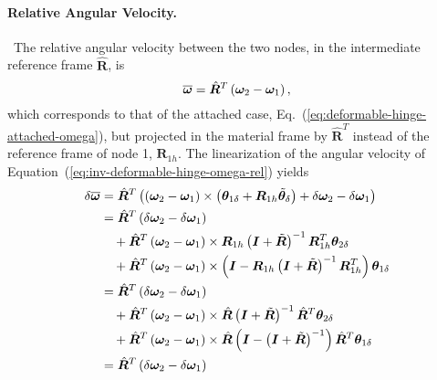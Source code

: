 \documentclass[10pt,fleqn,subeqn]{report}
\newcommand{\T}[1]{\bm{#1}}
\newcommand{\TT}[1]{\bm{#1}}
\begin{document}
\paragraph{Relative Angular Velocity.} \
The relative angular velocity between the two nodes,
in the intermediate reference frame $\hat{\T{R}}$, is
\begin{equation}
	\overline{\T{\omega}} = \hat{\T{R}}^T \plbr{\T{\omega}_2 - \T{\omega}_1}
	\label{eq:inv-deformable-hinge-omega-rel} ,
\end{equation}
which corresponds to that of the attached case,
Eq.~(\ref{eq:deformable-hinge-attached-omega}),
but projected in the material frame by $\hat{\TT{R}}^T$
instead of the reference frame of node 1, $\T{R}_{1h}$.
The linearization of the angular velocity 
of Equation~(\ref{eq:inv-deformable-hinge-omega-rel}) yields
\begin{align}
	\delta\overline{\T{\omega}}
	&= \hat{\T{R}}^T \plbr{
		\plbr{\T{\omega}_2 - \T{\omega}_1} \times \plbr{\T{\theta}_{1\delta} + \T{R}_{1h} \tilde{\T{\theta}}_{\delta}}
		+ \delta\T{\omega}_2 - \delta\T{\omega}_1
	} \nonumber \\
	&= \hat{\T{R}}^T \plbr{
		\delta\T{\omega}_2 - \delta\T{\omega}_1
	} \nonumber \\
	& \mbox{\hspace{10pt}} + \hat{\T{R}}^T \plbr{\T{\omega}_2 - \T{\omega}_1} \times 
			\T{R}_{1h}\plbr{\T{I} + \tilde{\T{R}}}^{-1} \T{R}_{1h}^T \T{\theta}_{2\delta} \nonumber \\
	& \mbox{\hspace{10pt}} + \hat{\T{R}}^T \plbr{\T{\omega}_2 - \T{\omega}_1} \times
			\plbr{\T{I} - \T{R}_{1h}\plbr{\T{I} + \tilde{\T{R}}}^{-1} \T{R}_{1h}^T} \T{\theta}_{1\delta} \nonumber \\
	&= \hat{\T{R}}^T \plbr{
		\delta\T{\omega}_2 - \delta\T{\omega}_1
	} \nonumber \\
	& \mbox{\hspace{10pt}} + \hat{\T{R}}^T \plbr{\T{\omega}_2 - \T{\omega}_1} \times 
			\hat{\T{R}}\plbr{\T{I} + \tilde{\T{R}}}^{-1} \hat{\T{R}}^T \T{\theta}_{2\delta} \nonumber \\
	& \mbox{\hspace{10pt}} + \hat{\T{R}}^T \plbr{\T{\omega}_2 - \T{\omega}_1} \times
			\hat{\T{R}}\plbr{\T{I} - \plbr{\T{I} + \tilde{\T{R}}}^{-1}} \hat{\T{R}}^T \T{\theta}_{1\delta} \nonumber \\
	&= \hat{\T{R}}^T \plbr{
		\delta\T{\omega}_2 - \delta\T{\omega}_1
	} \nonumber \\

\end{align}
\end{document}
